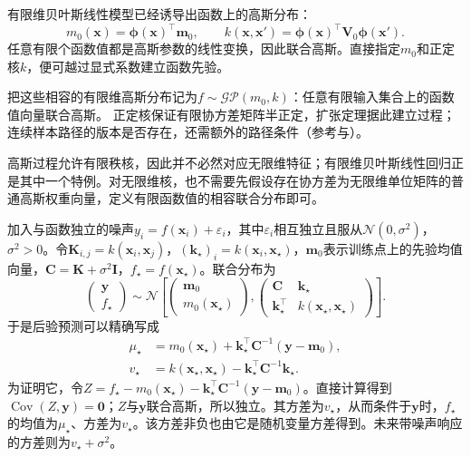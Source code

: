 有限维贝叶斯线性模型已经诱导出函数上的高斯分布：
\[
  m_0(\bm{x})=\bm{\phi}(\bm{x})^{\top}\bm{m}_0,\qquad
  k(\bm{x},\bm{x}')=\bm{\phi}(\bm{x})^{\top}\bm{V}_0\bm{\phi}(\bm{x}').
\]
任意有限个函数值都是高斯参数的线性变换，因此联合高斯。直接指定$m_0$和正定核$k$，便可越过显式系数建立函数先验。

把这些相容的有限维高斯分布记为$f\sim\mathcal{GP}(m_0,k)$：任意有限输入集合上的函数值向量联合高斯。
正定核保证有限协方差矩阵半正定，扩张定理据此建立过程；连续样本路径的版本是否存在，还需额外的路径条件（参考与）。

高斯过程允许有限秩核，因此并不必然对应无限维特征；有限维贝叶斯线性回归正是其中一个特例。对无限维核，也不需要先假设存在协方差为无限维单位矩阵的普通高斯权重向量，定义有限函数值的相容联合分布即可。

加入与函数独立的噪声$y_i=f(\bm{x}_i)+\varepsilon_i$，其中$\varepsilon_i$相互独立且服从$\mathcal{N}(0,\sigma^2)$，$\sigma^2>0$。令$\bm{K}_{i,j}=k(\bm{x}_i,\bm{x}_j)$，$(\bm{k}_{\star})_i=k(\bm{x}_i,\bm{x}_{\star})$，$\bm{m}_0$表示训练点上的先验均值向量，$\bm{C}=\bm{K}+\sigma^2\bm{I}$，$f_{\star}=f(\bm{x}_{\star})$。联合分布为
\[
  \begin{pmatrix}\bm{y}\\f_{\star}\end{pmatrix}
  \sim\mathcal{N}\!\left[
    \begin{pmatrix}\bm{m}_0\\m_0(\bm{x}_{\star})\end{pmatrix},
    \begin{pmatrix}
      \bm{C}&\bm{k}_{\star}\\
      \bm{k}_{\star}^{\top}&k(\bm{x}_{\star},\bm{x}_{\star})
    \end{pmatrix}\right].
\]
于是后验预测可以精确写成
\begin{equation}
  \begin{aligned}
    \mu_{\star}
      &=m_0(\bm{x}_{\star})
        +\bm{k}_{\star}^{\top}\bm{C}^{-1}(\bm{y}-\bm{m}_0),\\
    v_{\star}
      &=k(\bm{x}_{\star},\bm{x}_{\star})
        -\bm{k}_{\star}^{\top}\bm{C}^{-1}\bm{k}_{\star}.
  \end{aligned}
  \label{eq:regression-gp-posterior}
\end{equation}
为证明它，令$Z=f_{\star}-m_0(\bm{x}_{\star})-\bm{k}_{\star}^{\top}\bm{C}^{-1}(\bm{y}-\bm{m}_0)$。直接计算得到$\operatorname{Cov}(Z,\bm{y})=\bm{0}$；$Z$与$\bm{y}$联合高斯，所以独立。其方差为$v_{\star}$，从而条件于$\bm{y}$时，$f_{\star}$的均值为$\mu_{\star}$、方差为$v_{\star}$。该方差非负也由它是随机变量方差得到。未来带噪声响应的方差则为$v_{\star}+\sigma^2$。

